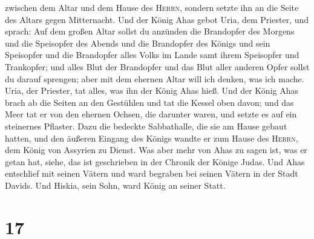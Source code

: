 zwischen dem Altar und dem Hause des \textsc{Herrn}, sondern setzte ihn
an die Seite des Altars gegen Mitternacht.  Und der König
Ahas gebot Uria, dem Priester, und sprach: Auf dem großen Altar sollst
du anzünden die Brandopfer des Morgens und die Speisopfer des Abends und
die Brandopfer des Königs und sein Speisopfer und die Brandopfer alles
Volks im Lande samt ihrem Speisopfer und Trankopfer; und alles Blut der
Brandopfer und das Blut aller anderen Opfer sollst du darauf sprengen;
aber mit dem ehernen Altar will ich denken, was ich mache.
 Uria, der Priester, tat alles, was ihn der König Ahas
hieß.  Und der König Ahas brach ab die Seiten an den
Gestühlen und tat die Kessel oben davon; und das Meer tat er von den
ehernen Ochsen, die darunter waren, und setzte es auf ein steinernes
Pflaster.  Dazu die bedeckte Sabbathalle, die sie am
Hause gebaut hatten, und den äußeren Eingang des Königs wandte er zum
Hause des \textsc{Herrn}, dem König von Assyrien zu Dienst.
 Was aber mehr von Ahas zu sagen ist, was er getan hat,
siehe, das ist geschrieben in der Chronik der Könige Judas.
 Und Ahas entschlief mit seinen Vätern und ward begraben
bei seinen Vätern in der Stadt Davids. Und Hiskia, sein Sohn, ward König
an seiner Statt.

\hypertarget{section-16}{%
\section{17}\label{section-16}}

